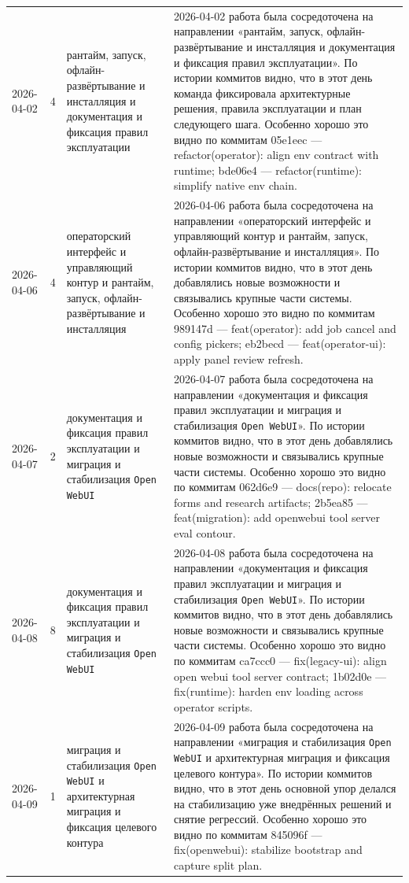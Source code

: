\begin{longtable}{p{} p{} p{} p{}}
2026-04-02 & 4 & рантайм, запуск, офлайн-развёртывание и инсталляция и документация и фиксация правил эксплуатации & 2026-04-02 работа была сосредоточена на направлении «рантайм, запуск, офлайн-развёртывание и инсталляция и документация и фиксация правил эксплуатации». По истории коммитов видно, что в этот день команда фиксировала архитектурные решения, правила эксплуатации и план следующего шага. Особенно хорошо это видно по коммитам 05e1eec — refactor(operator): align env contract with runtime; bde06e4 — refactor(runtime): simplify native env chain. \\
2026-04-06 & 4 & операторский интерфейс и управляющий контур и рантайм, запуск, офлайн-развёртывание и инсталляция & 2026-04-06 работа была сосредоточена на направлении «операторский интерфейс и управляющий контур и рантайм, запуск, офлайн-развёртывание и инсталляция». По истории коммитов видно, что в этот день добавлялись новые возможности и связывались крупные части системы. Особенно хорошо это видно по коммитам 989147d — feat(operator): add job cancel and config pickers; eb2becd — feat(operator-ui): apply panel review refresh. \\
2026-04-07 & 2 & документация и фиксация правил эксплуатации и миграция и стабилизация \texttt{Open WebUI} & 2026-04-07 работа была сосредоточена на направлении «документация и фиксация правил эксплуатации и миграция и стабилизация \texttt{Open WebUI}». По истории коммитов видно, что в этот день добавлялись новые возможности и связывались крупные части системы. Особенно хорошо это видно по коммитам 062d6e9 — docs(repo): relocate forms and research artifacts; 2b5ea85 — feat(migration): add openwebui tool server eval contour. \\
2026-04-08 & 8 & документация и фиксация правил эксплуатации и миграция и стабилизация \texttt{Open WebUI} & 2026-04-08 работа была сосредоточена на направлении «документация и фиксация правил эксплуатации и миграция и стабилизация \texttt{Open WebUI}». По истории коммитов видно, что в этот день добавлялись новые возможности и связывались крупные части системы. Особенно хорошо это видно по коммитам ca7ccc0 — fix(legacy-ui): align open webui tool server contract; 1b02d0e — fix(runtime): harden env loading across operator scripts. \\
2026-04-09 & 1 & миграция и стабилизация \texttt{Open WebUI} и архитектурная миграция и фиксация целевого контура & 2026-04-09 работа была сосредоточена на направлении «миграция и стабилизация \texttt{Open WebUI} и архитектурная миграция и фиксация целевого контура». По истории коммитов видно, что в этот день основной упор делался на стабилизацию уже внедрённых решений и снятие регрессий. Особенно хорошо это видно по коммитам 845096f — fix(openwebui): stabilize bootstrap and capture split plan. \\

\end{longtable}
